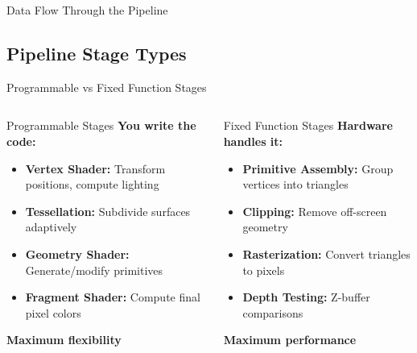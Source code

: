 \begin{frame}{Data Flow Through the Pipeline}
\begin{center}
\begin{tikzpicture}[scale=0.6]

    \end{tikzpicture}
  \end{center}
\end{frame}

\subsection{Pipeline Stage Types}
\begin{frame}{Programmable vs Fixed Function Stages}
  \begin{columns}
    \small
    \begin{column}{0.5\textwidth}
      \begin{raybox}{Programmable Stages}
        \textbf{You write the code:}
        \begin{itemize}
          \item \textbf{Vertex Shader:} Transform positions, compute lighting
          \item \textbf{Tessellation:} Subdivide surfaces adaptively
          \item \textbf{Geometry Shader:} Generate/modify primitives
          \item \textbf{Fragment Shader:} Compute final pixel colors
        \end{itemize}

        \vspace{0.2cm}
        \textcolor{PrimaryColor}{\textbf{Maximum flexibility}}
      \end{raybox}
    \end{column}
    \pause
    \begin{column}{0.5\textwidth}
      \begin{conceptbox}{Fixed Function Stages}
        \textbf{Hardware handles it:}
        \begin{itemize}
          \item \textbf{Primitive Assembly:} Group vertices into triangles
          \item \textbf{Clipping:} Remove off-screen geometry
          \item \textbf{Rasterization:} Convert triangles to pixels
          \item \textbf{Depth Testing:} Z-buffer comparisons
        \end{itemize}

        \vspace{0.2cm}
        \textcolor{SecondaryColor}{\textbf{Maximum performance}}
      \end{conceptbox}
    \end{column}
  \end{columns}
\end{frame}
